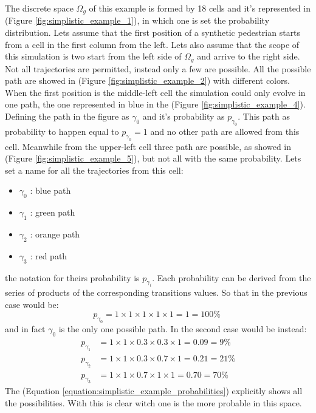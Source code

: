 \documentclass[class=article, crop=false]{standalone}
\begin{document}
The discrete space $\Omega_g$ of this example is formed by 18 cells and it's represented in (Figure \ref{fig:simplistic_example_1}), in which one is set the probability distribution.
Lets assume that the first position of a synthetic pedestrian starts from a cell in the first column from the left.
Lets also assume that the scope of this simulation is two start from the left side of $\Omega_g$ and arrive to the right side.
Not all trajectories are permitted, instead only a few are possible.
All the possible path are showed in (Figure \ref{fig:simplistic_example_2}) with different colors.
When the first position is the middle-left cell the simulation could only evolve in one path, the one represented in blue in the (Figure \ref{fig:simplistic_example_4}).
Defining the path in the figure as $\gamma_0$ and it's probability as $p_{\gamma_0}$.
This path as probability to happen equal to $p_{\gamma_0} = 1$ and no other path are allowed from this cell.
Meanwhile from the upper-left cell three path are possible, as showed in (Figure \ref{fig:simplistic_example_5}), but not all with the same probability.
Lets set a name for all the trajectories from this cell:
\begin{itemize}
\item $\gamma_0$ : blue path
\item $\gamma_1$ : green path
\item $\gamma_2$ : orange path
\item $\gamma_3$ : red path
\end{itemize}
the notation for theirs probability is $p_{\gamma_i}$.
Each probability can be derived from the series of products of the corresponding transitions values.
So that in the previous case would be:
\begin{equation*}
p_{\gamma_0} = 1 \times 1 \times 1 \times 1 \times 1 = 1 = 100 \% \;
\end{equation*}
and in fact $\gamma_0$ is the only one possible path.
In the second case would be instead:
\begin{equation}
\begin{split}
p_{\gamma_1} & = 1 \times 1 \times 0.3 \times 0.3 \times 1 = 0.09 = 9 \% \\
p_{\gamma_2} & = 1 \times 1 \times 0.3 \times 0.7 \times 1 = 0.21 = 21 \% \\
p_{\gamma_3} & = 1 \times 1 \times 0.7 \times 1 \times 1    = 0.70 = 70 \%
\end{split}
\label{equation:simplistic_example_probabilities}
\end{equation}
The (Equation \ref{equation:simplistic_example_probabilities}) explicitly shows all the possibilities.
With this is clear witch one is the more probable in this space.
\end{document}
